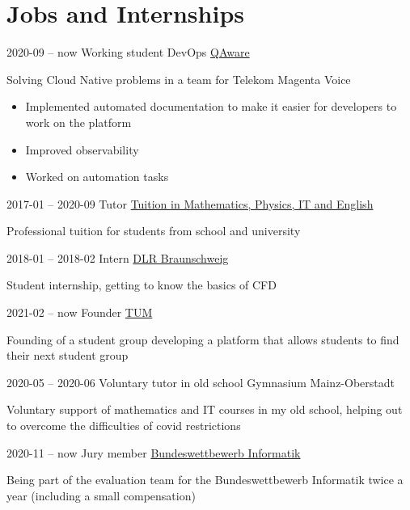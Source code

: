 \documentclass{tccv}
\begin{document}
\section{Jobs and Internships}
\begin{eventlist}

\item{ 2020-09 -- now }
	{ Working student DevOps }
	{ \href{https://www.qaware.de}{QAware} }

	Solving Cloud Native problems in a team for Telekom Magenta Voice 
	

	\begin{itemize}
	
		\item Implemented automated documentation to make it easier for developers to work on the platform
	
		\item Improved observability
	
		\item Worked on automation tasks
	
	\end{itemize}


\item{ 2017-01 -- 2020-09 }
	{ Tutor }
	{ \href{https://www.1plus1nachhilfe.de/}{Tuition in Mathematics, Physics, IT and English} }

	 
	Professional tuition for students from school and university


\item{ 2018-01 -- 2018-02 }
	{ Intern }
	{ \href{https://www.dlr.de/content/de/institutspraesentation/institut-fuer-aerodynamik-und-stroemungstechnik.html}{DLR Braunschweig} }

	 
	Student internship, getting to know the basics of CFD




\item{ 2021-02 -- now }
	{ Founder }
	{ \href{https://huddle.hsg.fs.tum.de}{TUM} }

	Founding of a student group developing a platform that allows students to find their next student group 
	

\item{ 2020-05 -- 2020-06 }
	{ Voluntary tutor in old school }
	{ Gymnasium Mainz-Oberstadt }

	Voluntary support of mathematics and IT courses in my old school, helping out to overcome the difficulties of covid restrictions 
	

\item{ 2020-11 -- now }
	{ Jury member }
	{ \href{https://bwinf.de/}{Bundeswettbewerb Informatik} }

	Being part of the evaluation team for the Bundeswettbewerb Informatik twice a year (including a small compensation) 
	


\end{eventlist}
\end{document}
